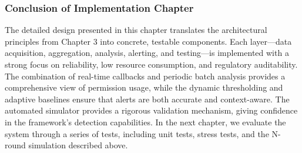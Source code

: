 \subsubsection{Conclusion of Implementation Chapter}

The detailed design presented in this chapter translates the architectural principles from Chapter 3 into concrete, testable components. Each layer—data acquisition, aggregation, analysis, alerting, and testing—is implemented with a strong focus on reliability, low resource consumption, and regulatory auditability. The combination of real-time callbacks and periodic batch analysis provides a comprehensive view of permission usage, while the dynamic thresholding and adaptive baselines ensure that alerts are both accurate and context-aware. The automated simulator provides a rigorous validation mechanism, giving confidence in the framework's detection capabilities. In the next chapter, we evaluate the system through a series of tests, including unit tests, stress tests, and the N-round simulation described above.

